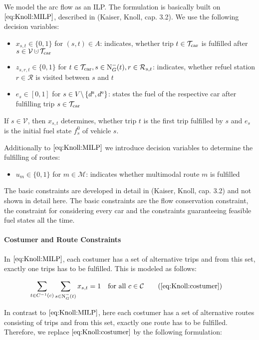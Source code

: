 We model the arc flow as an ILP. The formulation is basically built on $\eqref{eq:Knoll:MILP}$, described in (Kaiser, Knoll, cap. 3.2). We use the following decision variables:
\begin{itemize}
	\item{$x_{s,t}\in\{0,1\}$ for $(s,t)\in A$: indicates, whether trip $t\in\mathcal{T}_{\operatorname{car}}$ is fulfilled after $s\in \mathcal{V}\cupdot\Tcar$}
	\item{$z_{s,r,t}\in\{0,1\}$ for $t\in\mathcal{T}_{\operatorname{car}},s\in\operatorname{N}_G^-(t),r\in\mathcal{R}_{s,t}$: indicates, whether refuel station $r\in\mathcal{R}$ is visited between $s$ and $t$}
	\item{$e_s\in[0,1]$ for $s\in V\backslash\left\{d^{\operatorname{s}},d^{\operatorname{e}}\right\}$: states the fuel of the respective car after fulfilling trip $s\in\mathcal{T}_{\operatorname{car}}$}
\end{itemize}

If $s\in\mathcal{V}$, then $x_{s,t}$ determines, whether trip $t$ is the first trip fulfilled by $s$ and $e_s$ is the initial fuel state $f^0_s$ of vehicle $s$.

Additionally to $\eqref{eq:Knoll:MILP}$ we introduce decision variables to determine the fulfilling of routes:

\begin{itemize}
	\item{$u_m\in\{0,1\}$ for $m\in\mathcal{M}$: indicates whether multimodal route $m$ is fulfilled}
\end{itemize}

The basic constraints are developed in detail in (Kaiser, Knoll, cap. 3.2) and not shown in detail here. The basic constraints are the flow conservation constraint, the constraint for considering every car and the constraints guaranteeing feasible fuel states all the time.

\paragraph{Costumer and Route Constraints} \parfill

In $\eqref{eq:Knoll:MILP}$, each costumer has a set of alternative trips and from this set, exactly one trips has to be fulfilled. This is modeled as follows:

\begin{align*}
	\sum_{t\in C^{-1}(c)} \sum_{s\in\Nin(t)} x_{s,t} = 1 &&& \text{for all } c\in\mathcal{C} \tag{\ref{eq:Knoll:costumer}}
\end{align*}

In contrast to $\eqref{eq:Knoll:MILP}$, here each costumer has a set of alternative routes consisting of trips and from this set, exactly one route has to be fulfilled. Therefore, we replace $\eqref{eq:Knoll:costumer}$ by the following formulation:

